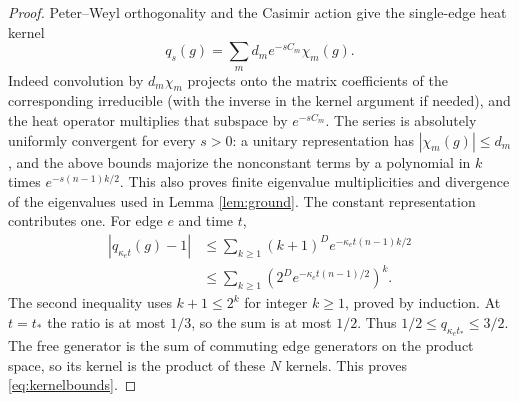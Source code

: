 \documentclass[11pt]{article}
\theoremstyle{definition}
\begin{document}
\begin{proof}
Peter--Weyl orthogonality and the Casimir action give the single-edge
heat kernel
\[
 q_s(g)=\sum_m d_m e^{-sC_m}\chi_m(g).
\]
Indeed convolution by $d_m\chi_m$ projects onto the matrix coefficients
of the corresponding irreducible (with the inverse in the kernel
argument if needed), and the heat operator multiplies that subspace by
$e^{-sC_m}$. The series is absolutely uniformly convergent for every
$s>0$: a unitary representation has $|\chi_m(g)|\leq d_m$, and the
above bounds majorize the nonconstant terms by a polynomial in $k$
times $e^{-s(n-1)k/2}$. This also proves finite eigenvalue multiplicities
and divergence of the eigenvalues used in Lemma \ref{lem:ground}.
The constant representation contributes one. For edge $e$ and time $t$,
\begin{align*}
 |q_{\kappa_et}(g)-1|
 &\leq\sum_{k\geq1}(k+1)^D e^{-\kappa_et(n-1)k/2}\\
 &\leq\sum_{k\geq1}\left(2^D e^{-\kappa_et(n-1)/2}\right)^k.
\end{align*}
The second inequality uses $k+1\leq2^k$ for integer $k\geq1$, proved
by induction. At $t=t_*$ the ratio is at most $1/3$, so the sum is at
most $1/2$. Thus $1/2\leq q_{\kappa_et_*}\leq3/2$. The free generator
is the sum of commuting edge generators on the product space, so its
kernel is the product of these $N$ kernels. This proves
\eqref{eq:kernelbounds}.
\end{proof}
\end{document}
